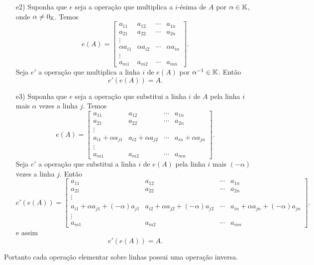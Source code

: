 \begin{prova}
\begin{enumerate}
		\item [e2)] Suponha que $e$ seja a opera\c{c}\~ao que multiplica a $i$-\'esima de $A$ por $\alpha \in \mathbb{K}$, onde $\alpha \ne 0_{\mathbb{K}}$. Temos
		\[
			e(A) = 
				\begin{bmatrix}
					a_{11} & a_{12} & \cdots & a_{1n}\\
					a_{21} & a_{22} & \cdots & a_{2n}\\
					\vdots\\
					\alpha a_{i1} & \alpha a_{i2} & \cdots & \alpha a_{in}\\
					\vdots\\
					a_{m1} & a_{m2} & \cdots & a_{mn}
				\end{bmatrix}.
		\]
		Seja $e'$ a opera\c{c}\~ao que multiplica a linha $i$ de $e(A)$ por $\alpha^{-1} \in \mathbb{K}$. Ent\~ao
		\[
			e'(e(A)) = A.
		\]
		\item [e3)] Suponha que $e$ seja a opera\c{c}\~ao que substitui a linha $i$ de $A$ pela linha $i$ mais $\alpha$ vezes a linha $j$. Temos
		\[
			e(A) = 
				\begin{bmatrix}
					a_{11} & a_{12} & \cdots & a_{1n}\\
					a_{21} & a_{22} & \cdots & a_{2n}\\
					\vdots\\
					a_{i1} + \alpha a_{j1} & a_{i2} + \alpha a_{j2} & \cdots & a_{in} + \alpha a_{jn}\\
					\vdots\\
					a_{m1} & a_{m2} & \cdots & a_{mn}
				\end{bmatrix}.
		\]
		Seja $e'$ a opera\c{c}\~ao que substitui a linha $i$ de $e(A)$ pela linha $i$ mais $(-\alpha)$ vezes a linha $j$. Ent\~ao
		\[
			e'(e(A)) = 
					\begin{bmatrix}
						a_{11} & a_{12} & \cdots & a_{1n}\\
						a_{21} & a_{22} & \cdots & a_{2n}\\
						\vdots\\
						a_{i1} + \alpha a_{j1} + (-\alpha)a_{j1} & a_{i2} + \alpha a_{j2} + (-\alpha)a_{j2} & \cdots & a_{in} + \alpha a_{jn} + (-\alpha)a_{jn}\\
						\vdots\\
						a_{m1} & a_{m2} & \cdots & a_{mn}
					\end{bmatrix}.
		\]
		e assim
		\[
			e'(e(A)) = A.
		\]
	\end{enumerate}
	Portanto cada opera\c{c}\~ao elementar sobre linhas possui uma opera\c{c}\~ao inversa.
\end{prova}

